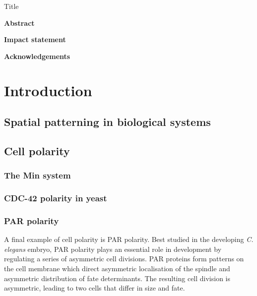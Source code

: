 \documentclass[12pt]{"report"}
\begin{document}
\begin{titlepage}
\centering
{\huge Title\\}
\end{titlepage}


\pagebreak

\begin{Large}
\textbf{Abstract}\\
\end{Large}


\pagebreak

\begin{Large}
\textbf{Impact statement}\\
\end{Large}


\pagebreak

\begin{Large}
\textbf{Acknowledgements}\\
\end{Large}


\tableofcontents
\listoffigures
\listoftables


\clearpage
\chapter{Introduction}

\clearpage
\section{Spatial patterning in biological systems}

\clearpage
\section{Cell polarity}
\subsection{The Min system}
\subsection{CDC-42 polarity in yeast}
\subsection{PAR polarity}

A final example of cell polarity is PAR polarity. Best studied in the developing \textit{C. elegans} embryo, PAR polarity plays an essential role in development by regulating a series of asymmetric cell divisions. PAR proteins form patterns on the cell membrane which direct asymmetric localisation of the spindle and asymmetric distribution of fate determinants. The resulting cell division is asymmetric, leading to two cells that differ in size and fate.\\
\end{document}

